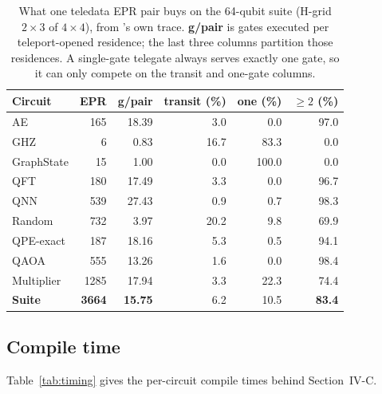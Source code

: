 \begin{table}[t]
\centering
\caption{What one teledata EPR pair buys on the 64-qubit suite (H-grid
  $2{\times}3$ of $4{\times}4$), from \dSABRE{}'s own trace.  \textbf{g/pair}
  is gates executed per teleport-opened residence; the last three columns
  partition those residences.  A single-gate telegate always serves exactly
  one gate, so it can only compete on the transit and one-gate columns.}
\label{tab:telegate_amort}
\setlength{\tabcolsep}{4pt}
\small
\begin{tabular}{@{}l rr rrr@{}}
\toprule
Circuit & EPR & g/pair & transit (\%) & one (\%) & $\geq 2$ (\%) \\
\midrule
AE          & 165  & 18.39 & 3.0  & 0.0   & 97.0 \\
GHZ         & 6    & 0.83  & 16.7 & 83.3  & 0.0  \\
GraphState  & 15   & 1.00  & 0.0  & 100.0 & 0.0  \\
QFT         & 180  & 17.49 & 3.3  & 0.0   & 96.7 \\
QNN         & 539  & 27.43 & 0.9  & 0.7   & 98.3 \\
Random      & 732  & 3.97  & 20.2 & 9.8   & 69.9 \\
QPE-exact   & 187  & 18.16 & 5.3  & 0.5   & 94.1 \\
QAOA        & 555  & 13.26 & 1.6  & 0.0   & 98.4 \\
Multiplier  & 1285 & 17.94 & 3.3  & 22.3  & 74.4 \\
\midrule
\textbf{Suite} & \textbf{3664} & \textbf{15.75} & 6.2 & 10.5 & \textbf{83.4} \\
\bottomrule
\end{tabular}
\end{table}

\subsection{Compile time}
\label{app:timing}
Table~\ref{tab:timing} gives the per-circuit compile times behind Section~IV-C.

